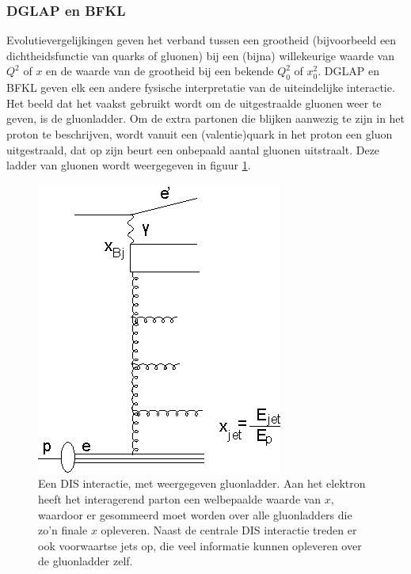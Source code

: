 \documentclass[a4paper,11pt]{article}
\numberwithin{equation}{section} %
\begin{document}
    \subsubsection{DGLAP en BFKL}
Evolutievergelijkingen geven het verband tussen een grootheid (bijvoorbeeld een dichtheidsfunctie van quarks of gluonen) bij een (bijna) willekeurige waarde van $Q^2$ of $x$ en de waarde van de grootheid bij een bekende $Q_0^2$ of $x_0^2$.
DGLAP en BFKL geven elk een andere fysische interpretatie van de uiteindelijke interactie.
Het beeld dat het vaakst gebruikt wordt om de uitgestraalde gluonen weer te geven, is de gluonladder.
Om de extra partonen die blijken aanwezig te zijn in het proton te beschrijven, wordt vanuit een (valentie)quark in het proton een gluon uitgestraald, dat op zijn beurt een onbepaald aantal gluonen uitstraalt. Deze ladder van gluonen wordt weergegeven in figuur \ref{fig:GluonLadder}.
\begin{figure} [H]
  \begin{center}
    \includegraphics[scale=1]{Afbeeldingen/GluonLadder.eps}
    \caption{Een DIS interactie, met weergegeven gluonladder. Aan het elektron heeft het interagerend parton een welbepaalde waarde van $x$, waardoor er gesommeerd moet worden over alle gluonladders die zo’n finale $x$ opleveren. Naast de centrale DIS interactie treden er ook voorwaartse jets op, die veel informatie kunnen opleveren over de gluonladder zelf. \cite{Kiesling}}
   \label{fig:GluonLadder}
  \end{center}
\end{figure}
\end{document}
